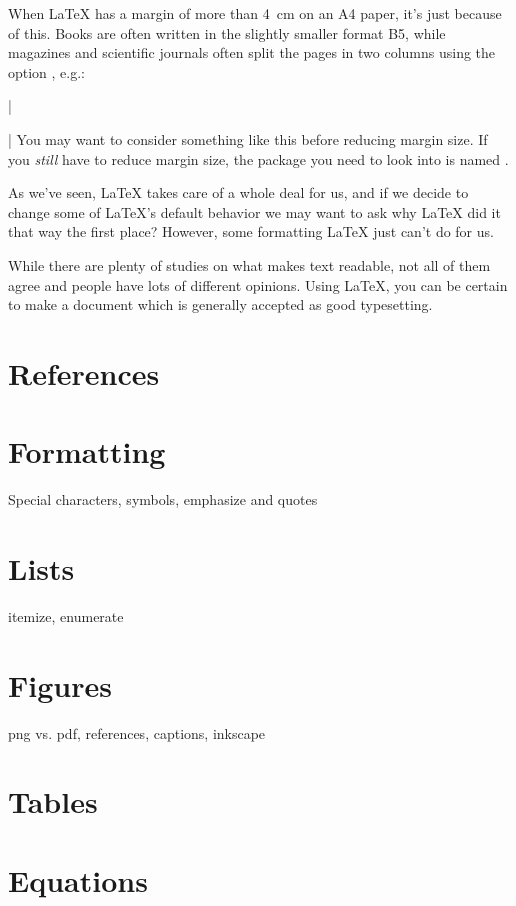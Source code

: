 {When \LaTeX{} has a margin of more than 4~cm on an A4 paper, it's just because of this. Books are often written in the slightly smaller format B5, while magazines and scientific journals often split the pages in two columns using the option , e.g.:

\latexone|\usepackage[a4paper,twocolumn]{article}|
\noindent You may want to consider something like this before reducing margin size. If you \emph{still} have to reduce margin size, the package you need to look into is named .

As we've seen, \LaTeX{} takes care of a whole deal for us, and if we decide to change some of \LaTeX{}'s default behavior we may want to ask why \LaTeX{} did it that way the first place? However, some formatting \LaTeX{} just can't do for us.

While there are plenty of studies on what makes text readable, not all of them agree and people have lots of different opinions. Using \LaTeX{}, you can be certain to make a document which is generally accepted as good typesetting.

\section{References}

\section{Formatting}
Special characters, symbols, emphasize and quotes

\section{Lists}
itemize, enumerate

\section{Figures}
png vs. pdf, references, captions, inkscape

\section{Tables}

\section{Equations}\label{sec:latex:equations}

}
